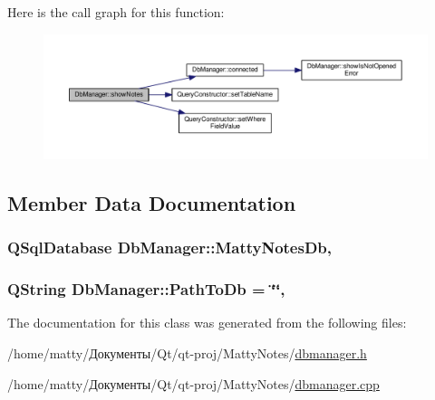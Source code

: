 Here is the call graph for this function\+:
\nopagebreak
\begin{figure}[H]
\begin{center}
\leavevmode
\includegraphics[width=350pt]{class_db_manager_a64082f688c2d477c92a6f3a67fdebbf8_cgraph}
\end{center}
\end{figure}




\subsection{Member Data Documentation}
\subsubsection[{\texorpdfstring{Matty\+Notes\+Db}{MattyNotesDb}}]{\setlength{\rightskip}{0pt plus 5cm}Q\+Sql\+Database Db\+Manager\+::\+Matty\+Notes\+Db\hspace{0.3cm}{\ttfamily [static]}, {\ttfamily [private]}}\hypertarget{class_db_manager_a3f6052f559a7a72eef66848ebc9f3eaa}{}\label{class_db_manager_a3f6052f559a7a72eef66848ebc9f3eaa}
\subsubsection[{\texorpdfstring{Path\+To\+Db}{PathToDb}}]{\setlength{\rightskip}{0pt plus 5cm}Q\+String Db\+Manager\+::\+Path\+To\+Db = \char`\"{}\char`\"{}\hspace{0.3cm}{\ttfamily [static]}, {\ttfamily [private]}}\hypertarget{class_db_manager_aa3f62582e546ee853cebd75386e26736}{}\label{class_db_manager_aa3f62582e546ee853cebd75386e26736}


The documentation for this class was generated from the following files\+:\begin{DoxyCompactItemize}
\item 
/home/matty/Документы/\+Qt/qt-\/proj/\+Matty\+Notes/\hyperlink{dbmanager_8h}{dbmanager.\+h}\item 
/home/matty/Документы/\+Qt/qt-\/proj/\+Matty\+Notes/\hyperlink{dbmanager_8cpp}{dbmanager.\+cpp}\end{DoxyCompactItemize}

